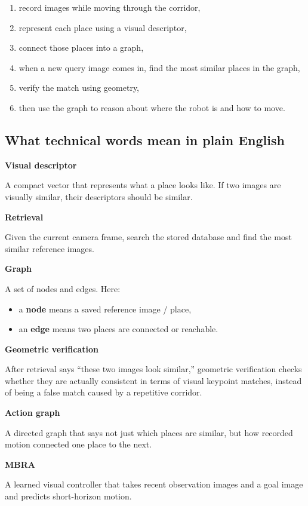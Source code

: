 \documentclass[11pt,a4paper]{article}
\begin{document}
\begin{enumerate}[nosep]
  \item record images while moving through the corridor,
  \item represent each place using a visual descriptor,
  \item connect those places into a graph,
  \item when a new query image comes in, find the most similar places in the graph,
  \item verify the match using geometry,
  \item then use the graph to reason about where the robot is and how to move.
\end{enumerate}

\subsection*{What technical words mean in plain English}

\textbf{Visual descriptor}

A compact vector that represents what a place looks like.
If two images are visually similar, their descriptors should be similar.

\textbf{Retrieval}

Given the current camera frame, search the stored database and find the most
similar reference images.

\textbf{Graph}

A set of nodes and edges.
Here:

\begin{itemize}[nosep]
  \item a \textbf{node} means a saved reference image / place,
  \item an \textbf{edge} means two places are connected or reachable.
\end{itemize}

\textbf{Geometric verification}

After retrieval says ``these two images look similar,'' geometric verification
checks whether they are actually consistent in terms of visual keypoint matches,
instead of being a false match caused by a repetitive corridor.

\textbf{Action graph}

A directed graph that says not just which places are similar, but how recorded
motion connected one place to the next.

\textbf{MBRA}

A learned visual controller that takes recent observation images and a goal image
and predicts short-horizon motion.
\end{document}
